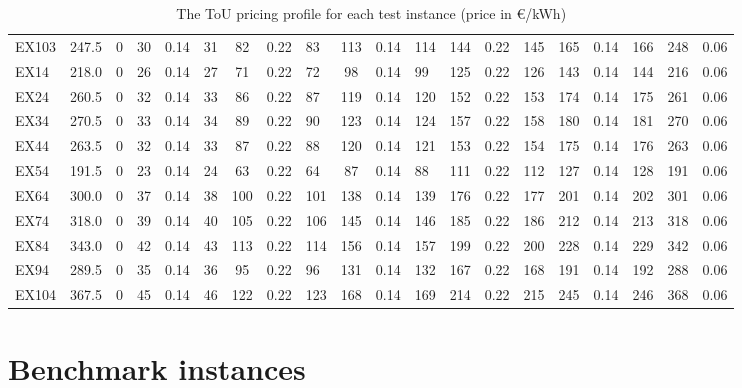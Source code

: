 \documentclass[preprint, 3p, review, 12pt]{elsarticle}
\begin{document}
\begin{table}[h!]
{\begin{tabular}{|lr|lcr|lcr|lcr|lcr|lcr|lcr|}
EX103 & 247.5 & 0 & 30 & 0.14 & 31 & 82 & 0.22 & 83 & 113 & 0.14 & 114 & 144 & 0.22 & 145 & 165 & 0.14 & 166 & 248 & 0.06 \\
EX14 & 218.0 & 0 & 26 & 0.14 & 27 & 71 & 0.22 & 72 & 98 & 0.14 & 99 & 125 & 0.22 & 126 & 143 & 0.14 & 144 & 216 & 0.06 \\
EX24 & 260.5 & 0 & 32 & 0.14 & 33 & 86 & 0.22 & 87 & 119 & 0.14 & 120 & 152 & 0.22 & 153 & 174 & 0.14 & 175 & 261 & 0.06 \\
EX34 & 270.5 & 0 & 33 & 0.14 & 34 & 89 & 0.22 & 90 & 123 & 0.14 & 124 & 157 & 0.22 & 158 & 180 & 0.14 & 181 & 270 & 0.06 \\
EX44 & 263.5 & 0 & 32 & 0.14 & 33 & 87 & 0.22 & 88 & 120 & 0.14 & 121 & 153 & 0.22 & 154 & 175 & 0.14 & 176 & 263 & 0.06 \\
EX54 & 191.5 & 0 & 23 & 0.14 & 24 & 63 & 0.22 & 64 & 87 & 0.14 & 88 & 111 & 0.22 & 112 & 127 & 0.14 & 128 & 191 & 0.06 \\
EX64 & 300.0 & 0 & 37 & 0.14 & 38 & 100 & 0.22 & 101 & 138 & 0.14 & 139 & 176 & 0.22 & 177 & 201 & 0.14 & 202 & 301 & 0.06 \\
EX74 & 318.0 & 0 & 39 & 0.14 & 40 & 105 & 0.22 & 106 & 145 & 0.14 & 146 & 185 & 0.22 & 186 & 212 & 0.14 & 213 & 318 & 0.06 \\
EX84 & 343.0 & 0 & 42 & 0.14 & 43 & 113 & 0.22 & 114 & 156 & 0.14 & 157 & 199 & 0.22 & 200 & 228 & 0.14 & 229 & 342 & 0.06 \\
EX94 & 289.5 & 0 & 35 & 0.14 & 36 & 95 & 0.22 & 96 & 131 & 0.14 & 132 & 167 & 0.22 & 168 & 191 & 0.14 & 192 & 288 & 0.06 \\
EX104 & 367.5 & 0 & 45 & 0.14 & 46 & 122 & 0.22 & 123 & 168 & 0.14 & 169 & 214 & 0.22 & 215 & 245 & 0.14 & 246 & 368 & 0.06\\
\hline
\end{tabular}%
}
\caption{The ToU pricing profile for each test instance (price in €/kWh)}
\label{tab:all_instance}
\end{table}


\section{Benchmark instances}
\label{app2}
\end{document}

